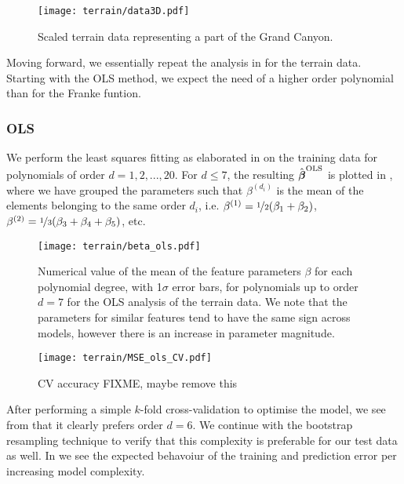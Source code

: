     \begin{figure}
        \texttt{[image: terrain/data3D.pdf]}
        \caption{Scaled terrain data representing a part of the Grand Canyon.}
        \label{fig:gc_data}
    \end{figure}

    Moving forward, we essentially repeat the analysis in  for the terrain data. Starting with the OLS method, we expect the need of a higher order polynomial than for the Franke funtion.

        \subsubsection{OLS}\label{sec:gc_olsanalysis}

        We perform the least squares fitting as elaborated in  on the training data for polynomials of order $d=1,2,..., 20$. For $d\leq 7$, the resulting $\hat{\boldsymbol{\beta}}^\text{OLS}$ is plotted in , where we have grouped the parameters such that $\beta^{(d_i)}$ is the mean of the elements belonging to the same order $d_i$, i.e. $\beta^{(1)} = \nicefrac{1}{2}(\beta_1 + \beta_2)$, $\beta^{(2)} = \nicefrac{1}{3}(\beta_3 + \beta_4 + \beta_5)$, etc. 

        \begin{figure}
            \texttt{[image: terrain/beta\_ols.pdf]}
            \caption{Numerical value of the mean of the feature parameters $\beta$ for each polynomial degree, with 1$\sigma$ error bars, for polynomials up to order $d=7$ for the OLS analysis of the terrain data. We note that the parameters for similar features tend to have the same sign across models, however there is an increase in parameter magnitude.}
            \label{fig:gc_beta_with_standard_deviation}
        \end{figure}

        
        \begin{figure}
            \texttt{[image: terrain/MSE\_ols\_CV.pdf]}
            \caption{CV accuracy FIXME, maybe remove this}
            \label{fig:gc_cv_errors_ols}
        \end{figure}

        After performing a simple $k$-fold cross-validation to optimise the model, we see from  that it clearly prefers order $d=6$. We continue with the bootstrap resampling technique to verify that this complexity is preferable for our test data as well. In  we see the expected behavoiur of the training and prediction error per increasing model complexity.
        
